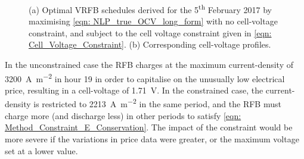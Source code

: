 \documentclass[preprint,3p,review,authoryear,10pt]{elsarticle}
\begin{document}
\begin{figure}[!ht]
\centering
{}
\caption{(a) Optimal VRFB schedules derived for the 5\textsuperscript{th} February 2017 by maximising \cref{eqn: NLP_true_OCV_long_form} with no cell-voltage constraint, and subject to the cell voltage constraint given in \cref{eqn: Cell_Voltage_Constraint}. (b) Corresponding cell-voltage profiles.}
\end{figure}

In the unconstrained case the RFB charges at the maximum current-density of \SI{3200}{\ampere\per\square\meter} in hour 19 in order to capitalise on the unusually low electrical price, resulting in a cell-voltage of \SI{1.71}{\volt}. In the constrained case, the current-density is restricted to \SI{2213}{\ampere\per\square\meter} in the same period, and the RFB must charge more (and discharge less) in other periods to satisfy \cref{eqn: Method_Constraint_E_Conservation}. The impact of the constraint would be more severe if the variations in price data were greater, or the maximum voltage set at a lower value.
\end{document}
